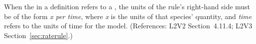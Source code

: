 When the  in a \RateRule definition refers to a \Species,
the units of the rule's right-hand side must be of the form \emph{x per
time}, where \emph{x} is the units of that species' quantity, and
\emph{time} refers to the units of time for the model.  (References: L2V2
Section~4.11.4; L2V3 Section~\ref{sec:raterule}.)
